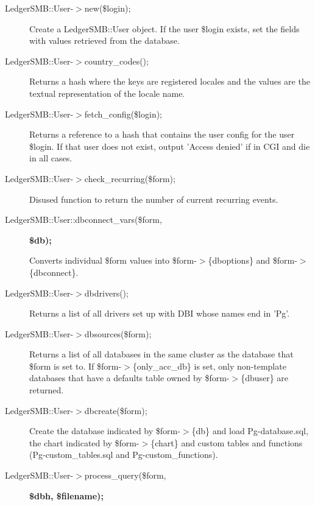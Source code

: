 \begin{description}
\begin{description}
\begin{description}
\begin{description}
\begin{description}
\begin{description}
\begin{description}
\item[{LedgerSMB::User-$>$new(\$login);}] \mbox{}

Create a LedgerSMB::User object.  If the user \$login exists, set the fields
with values retrieved from the database.


\item[{LedgerSMB::User-$>$country\_codes();}] \mbox{}

Returns a hash where the keys are registered locales and the values are the
textual representation of the locale name.


\item[{LedgerSMB::User-$>$fetch\_config(\$login);}] \mbox{}

Returns a reference to a hash that contains the user config for the user \$login.
If that user does not exist, output 'Access denied' if in CGI and die in all
cases.


\item[{LedgerSMB::User-$>$check\_recurring(\$form);}] \mbox{}

Disused function to return the number of current recurring events.


\item[{LedgerSMB::User::dbconnect\_vars(\$form,}] \textbf{\$db);}

Converts individual \$form values into \$form-$>$\{dboptions\} and \$form-$>$\{dbconnect\}.


\item[{LedgerSMB::User-$>$dbdrivers();}] \mbox{}

Returns a list of all drivers set up with DBI whose names end in 'Pg'.


\item[{LedgerSMB::User-$>$dbsources(\$form);}] \mbox{}

Returns a list of all databases in the same cluster as the database that \$form
is set to.  If \$form-$>$\{only\_acc\_db\} is set, only non-template databases that
have a defaults table owned by \$form-$>$\{dbuser\} are returned.


\item[{LedgerSMB::User-$>$dbcreate(\$form);}] \mbox{}

Create the database indicated by \$form-$>$\{db\} and load Pg-database.sql, the chart
indicated by \$form-$>$\{chart\} and custom tables and functions
(Pg-custom\_tables.sql and Pg-custom\_functions).


\item[{LedgerSMB::User-$>$process\_query(\$form,}] \textbf{\$dbh, \$filename);}


\end{description}
\end{description}
\end{description}
\end{description}
\end{description}
\end{description}
\end{description}
